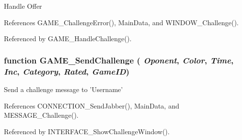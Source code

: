 Handle Offer 

References GAME\_\-ChallengeError(), MainData, and WINDOW\_\-Challenge().

Referenced by GAME\_\-HandleChallenge().
\subsubsection{\setlength{\rightskip}{0pt plus 5cm}function GAME\_\-SendChallenge ( {\em Oponent}, \/   {\em Color}, \/   {\em Time}, \/   {\em Inc}, \/   {\em Category}, \/   {\em Rated}, \/   {\em GameID})}\label{game_2challenge_8js_f5587530ce95c526640284de3a7c3b60}


Send a challenge message to 'Username' 

References CONNECTION\_\-SendJabber(), MainData, and MESSAGE\_\-Challenge().

Referenced by INTERFACE\_\-ShowChallengeWindow().